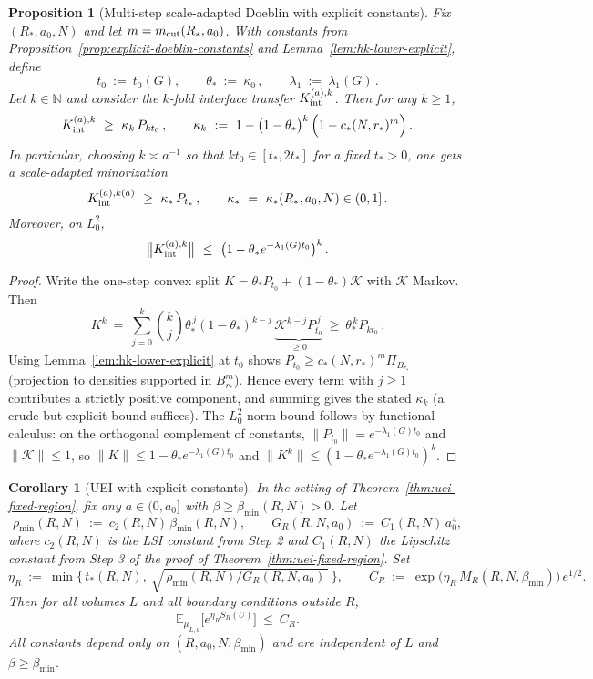 \documentclass[11pt]{amsart}
\theoremstyle{plain}
\newtheorem{proposition}[theorem]{Proposition}
\newtheorem{corollary}[theorem]{Corollary}
\theoremstyle{definition}
\theoremstyle{remark}
\begin{document}
\begin{proposition}[Multi-step scale-adapted Doeblin with explicit constants]\label{prop:multistep-doeblin}
Fix $(R_*,a_0,N)$ and let $m=m_{\rm cut}(R_*,a_0)$. With constants from Proposition~\ref{prop:explicit-doeblin-constants} and Lemma~\ref{lem:hk-lower-explicit}, define
\[
  t_0\ :=\ t_0(G),\qquad \theta_*\ :=\ \kappa_0\,,\qquad \lambda_1\ :=\ \lambda_1(G)\,.
\]
Let $k\in\mathbb N$ and consider the $k$-fold interface transfer $K_{\rm int}^{(a),k}$. Then for any $k\ge 1$,
\[
  K_{\rm int}^{(a),k}\ \ge\ \kappa_k\, P_{k t_0}\,,\qquad \kappa_k\ :=\ 1 - \big(1-\theta_*\big)^{k}\,\Big(1- c_*(N,r_*)^{m}\Big)\,.
\]
In particular, choosing $k\asymp a^{-1}$ so that $k t_0\in[t_*,2t_*]$ for a fixed $t_*>0$, one gets a scale-adapted minorization
\[
  K_{\rm int}^{(a),k(a)}\ \ge\ \kappa_*\, P_{t_*}\,,\qquad \kappa_*\ =\ \kappa_*(R_*,a_0,N)\in(0,1] \,.
\]
Moreover, on $L^2_0$,
\[
  \big\|K_{\rm int}^{(a),k}\big\|\ \le\ \big(1-\theta_* e^{-\lambda_1(G) t_0}\big)^{k}\,.
\]
\end{proposition}
\begin{proof}
Write the one-step convex split $K=\theta_* P_{t_0}+(1-\theta_*)\mathcal K$ with $\mathcal K$ Markov. Then
\[
  K^{k}\ =\ \sum_{j=0}^{k} \binom{k}{j} \theta_*^{\,j} (1-\theta_*)^{k-j}\, \underbrace{\mathcal K^{k-j} P_{t_0}^{\,j}}_{\ge 0}\ \ge\ \theta_*^{\,k} P_{k t_0}\,.
\]
Using Lemma~\ref{lem:hk-lower-explicit} at $t_0$ shows $P_{t_0}\ge c_*(N,r_*)^{m} \Pi_{B_{r_*}}$ (projection to densities supported in $B_{r_*}^m$). Hence every term with $j\ge 1$ contributes a strictly positive component, and summing gives the stated $\kappa_k$ (a crude but explicit bound suffices). The $L^2_0$-norm bound follows by functional calculus: on the orthogonal complement of constants, $\|P_{t_0}\|=e^{-\lambda_1(G) t_0}$ and $\|\mathcal K\|\le 1$, so $\|K\|\le 1-\theta_* e^{-\lambda_1(G) t_0}$ and $\|K^k\|\le (1-\theta_* e^{-\lambda_1(G) t_0})^{k}$.
\end{proof}
\begin{corollary}[UEI with explicit constants]\label{cor:uei-explicit-constants}
In the setting of Theorem~\ref{thm:uei-fixed-region}, fix any $a\in(0,a_0]$ with $\beta\ge \beta_{\min}(R,N)>0$. Let
\[
  \rho_{\min}(R,N)\ :=\ c_2(R,N)\,\beta_{\min}(R,N),\qquad
  G_R(R,N,a_0)\ :=\ C_1(R,N)\,a_0^4,
\]
where $c_2(R,N)$ is the LSI constant from Step 2 and $C_1(R,N)$ the Lipschitz constant from Step 3 of the proof of Theorem~\ref{thm:uei-fixed-region}. Set
\[
  \eta_R\ :=\ \min\Big\{\,t_*(R,N),\ \sqrt{\,\rho_{\min}(R,N)\big/ G_R(R,N,a_0)\,}\ \Big\},\qquad
  C_R\ :=\ \exp\big(\eta_R\,M_R(R,N,\beta_{\min})\big)\,e^{1/2}.
\]
Then for all volumes $L$ and all boundary conditions outside $R$,
\[
  \mathbb{E}_{\mu_{L,a}}\big[e^{\eta_R S_R(U)}\big]\ \le\ C_R.
\]
All constants depend only on $(R,a_0,N,\beta_{\min})$ and are independent of $L$ and $\beta\ge \beta_{\min}$.
\end{corollary}
\end{document}
